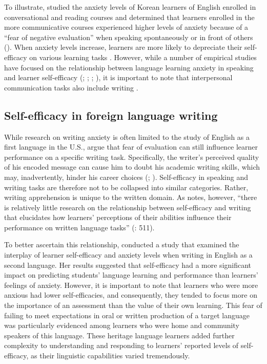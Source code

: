 \documentclass[output=paper]{langscibook}
\begin{document}
To illustrate, \citet{Kim2009} studied the anxiety levels of Korean learners of English enrolled in conversational and reading courses and determined that learners enrolled in the more communicative courses experienced higher levels of anxiety because of a “fear of negative evaluation” when speaking spontaneously or in front of others (\citeyear[153]{Kim2009}). When anxiety levels increase, learners are more likely to depreciate their self-efficacy on various learning tasks \citep{MacIntyreClément1997}. However, while a number of empirical studies have focused on the relationship between language learning anxiety in speaking and learner self-efficacy (\citealt{Horwitz2001}; \citealt{HorwitzCope1986}; \citealt{Phillips1992}; \citealt{Woodrow2006}), it is important to note that interpersonal communication tasks also include writing \citep{ChengHorwitzSchallert1999}.

\subsection{{Self-efficacy in foreign language writing}}

While research on writing anxiety is often limited to the study of English as a first language in the U.S., \citet{ChengHorwitzSchallert1999} argue that fear of evaluation can still influence learner performance on a specific writing task. Specifically, the writer’s perceived quality of his encoded message can cause him to doubt his academic writing skills, which may, inadvertently, hinder his career choices (\citealt{DalyMiller1975}; \citealt{DalyShamo1976}). Self-efficacy in speaking and writing tasks are therefore not to be collapsed into similar categories. Rather, writing apprehension is unique to the written domain. As \citet{Woodrow2011} notes, however, “there is relatively little research on the relationship between self-efficacy and writing that elucidates how learners’ perceptions of their abilities influence their performance on written language tasks'' (\citeyear{Woodrow2011}: 511).

To better ascertain this relationship, \citet{Woodrow2011} conducted a study that examined the interplay of learner self-efficacy and anxiety levels when writing in English as a second language. Her results suggested that self-efficacy had a more significant impact on predicting students’ language learning and performance than learners’ feelings of anxiety. However, it is important to note that learners who were more anxious had lower self-efficacies, and consequently, they tended to focus more on the importance of an assessment than the value of their own learning. This fear of failing to meet expectations in oral or written production of a target language was particularly evidenced among learners who were home and community speakers of this language. These heritage language learners added further complexity to understanding and responding to learners’ reported levels of self-efficacy, as their linguistic capabilities varied tremendously.
\end{document}
